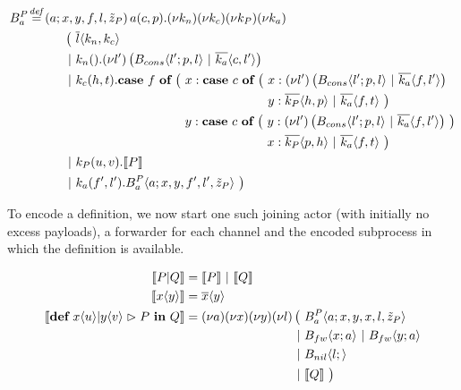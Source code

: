 \begin{align*}
  \adef*{B_a^P}{a}{x,y,f,l,\tilde{z}_P}{\arcv{a}{c,p} . \anew{k_n}{\anew{k_c}{\anew{k_P}{\anew{k_a}{
    \\
    &\hspace{1cm}
    \begin{aligned}[t]
      \big(\ &\asnd{l}{k_n,k_c}
      \\
      \apar  &\arcv{k_n}{} . \anew{l'}{\parens{\ains{B_{cons}}{l'}{p, l} \apar \asnd{k_a}{c, l'}}}
      \\
      \apar  &\arcv{k_c}{h,t} .
        \begin{aligned}[t]
          \acse*{f}{\ 
            &\aalt{x}{
              \begin{aligned}[t]
                \acse*{c}{\ 
                  &\aalt{x}{\anew*{l'}{
                    \ains{B_{cons}}{l'}{p,l} \apar \asnd{k_a}{f,l'}
                  }}\\
                  &\aalt{y}{
                    \asnd{k_P}{h,p} \apar \asnd{k_a}{f,t}
                  }\ 
                }
              \end{aligned}
            }\\
            &\aalt{y}{
              \begin{aligned}[t]
                \acse*{c}{\ 
                  &\aalt{y}{\anew*{l'}{
                    \ains{B_{cons}}{l'}{p,l} \apar \asnd{k_a}{f,l'}
                  }}\\
                  &\aalt{x}{
                    \asnd{k_P}{p,h} \apar \asnd{k_a}{f,t}
                  }\ 
                }
              \end{aligned}
            }\ 
          }
        \end{aligned}
      \\
      \apar  &\arcv{k_P}{u,v} . \encMJtoAP{P}
      \\
      \apar  &\arcv{k_a}{f',l'} . \ains{B_a^P}{a}{x, y, f', l',\tilde{z}_P}
      \ \big)
    \end{aligned}
  }}}}} \\
\end{align*}

To encode a \joincalc definition,
we now start one such joining actor (with initially no excess payloads),
a forwarder for each channel
and the encoded subprocess in which the definition is available.

\begin{align*}
  \encMJtoAP{P \jpar Q}
  &= \encMJtoAP{P} \apar \encMJtoAP{Q}
  \\
  \encMJtoAP{\jsnd{x}{y}}
  &= \asnd{x}{y}
  \\
  \encMJtoAP{\jdef{\jrct{\jrcv{x}{u} \jpat \jrcv{y}{v}}{P}}{Q}}
  &= \anew{a}{\anew{x}{\anew{y}{\anew{l}{
    \begin{aligned}[t]
      \big(\ &\ains{B_a^P}{a}{x, y, x, l, \tilde{z}_P} \\
      \apar  &\ains{B_{fw}}{x}{a} \apar \ains{B_{fw}}{y}{a} \\
      \apar  &\ains{B_{nil}}{l}{} \\
      \apar  &\encMJtoAP{Q}
      \ \big)
    \end{aligned}
  }}}}
\end{align*}

